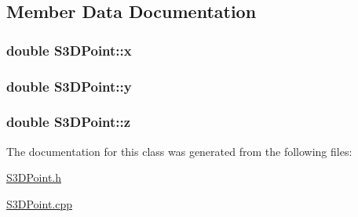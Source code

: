 \subsection{Member Data Documentation}
\hypertarget{class_s3_d_point_ae6b39611c603bd43ea67bcf4438a932a}{
\subsubsection[{x}]{\setlength{\rightskip}{0pt plus 5cm}double {\bf S3DPoint::x}}}
\label{class_s3_d_point_ae6b39611c603bd43ea67bcf4438a932a}
\hypertarget{class_s3_d_point_a487ab6dfdcb00ddbf9485f0b71ad7fb5}{
\subsubsection[{y}]{\setlength{\rightskip}{0pt plus 5cm}double {\bf S3DPoint::y}}}
\label{class_s3_d_point_a487ab6dfdcb00ddbf9485f0b71ad7fb5}
\hypertarget{class_s3_d_point_ace7df3a87344170ddb4bfc92c3d5ec3d}{
\subsubsection[{z}]{\setlength{\rightskip}{0pt plus 5cm}double {\bf S3DPoint::z}}}
\label{class_s3_d_point_ace7df3a87344170ddb4bfc92c3d5ec3d}


The documentation for this class was generated from the following files:\begin{DoxyCompactItemize}
\item 
\hyperlink{_s3_d_point_8h}{S3DPoint.h}\item 
\hyperlink{_s3_d_point_8cpp}{S3DPoint.cpp}\end{DoxyCompactItemize}
